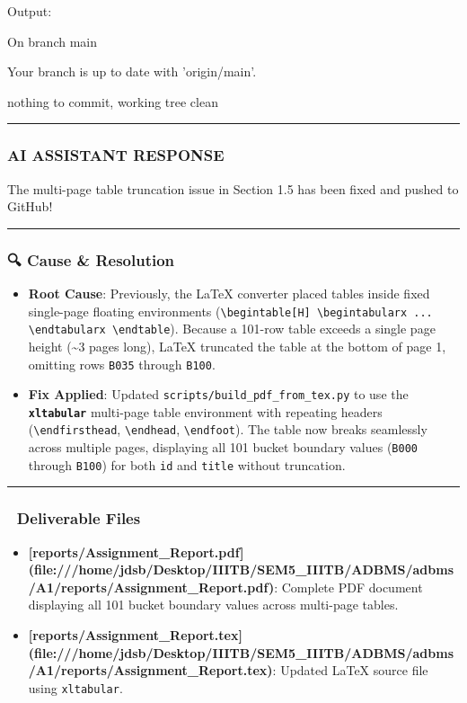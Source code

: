 \documentclass[11pt,a4paper]{article}
\begin{document}
{{{Output:

On branch main

Your branch is up to date with 'origin/main'.


nothing to commit, working tree clean


\hrule

\subsubsection{AI ASSISTANT RESPONSE}

The multi-page table truncation issue in Section 1.5 has been fixed and pushed to GitHub!


\hrule


\subsubsection{🔍 Cause \& Resolution}

\begin{itemize}
\item \textbf{Root Cause}: Previously, the LaTeX converter placed tables inside fixed single-page floating environments (\texttt{\textbackslash{}begin{table}[H] \textbackslash{}begin{tabularx} ... \textbackslash{}end{tabularx} \textbackslash{}end{table}}). Because a 101-row table exceeds a single page height (\textasciitilde{}3 pages long), LaTeX truncated the table at the bottom of page 1, omitting rows \texttt{B035} through \texttt{B100}.
\item \textbf{Fix Applied}: Updated \texttt{scripts/build\_pdf\_from\_tex.py} to use the \textbf{\texttt{xltabular}} multi-page table environment with repeating headers (\texttt{\textbackslash{}endfirsthead}, \texttt{\textbackslash{}endhead}, \texttt{\textbackslash{}endfoot}). The table now breaks seamlessly across multiple pages, displaying all 101 bucket boundary values (\texttt{B000} through \texttt{B100}) for both \texttt{id} and \texttt{title} without truncation.
\end{itemize}

\hrule


\subsubsection{📂 Deliverable Files}
\begin{itemize}
\item \textbf{[reports/Assignment\_Report.pdf](file:///home/jdsb/Desktop/IIITB/SEM5\_IIITB/ADBMS/adbms/A1/reports/Assignment\_Report.pdf)}: Complete PDF document displaying all 101 bucket boundary values across multi-page tables.
\item \textbf{[reports/Assignment\_Report.tex](file:///home/jdsb/Desktop/IIITB/SEM5\_IIITB/ADBMS/adbms/A1/reports/Assignment\_Report.tex)}: Updated LaTeX source file using \texttt{xltabular}.
\end{itemize}

}}}
\end{document}
